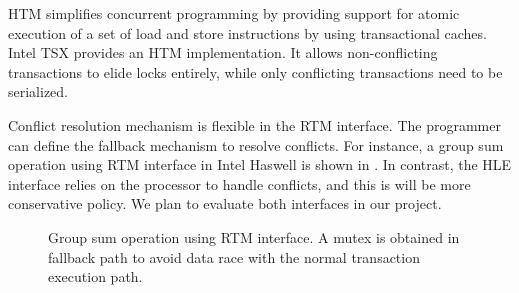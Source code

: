 HTM simplifies concurrent programming by providing support for atomic execution
of a set of load and store instructions by using transactional caches. Intel TSX
provides an HTM implementation. It allows non-conflicting transactions to elide
locks entirely, while only conflicting transactions need to be serialized. 

Conflict resolution mechanism is flexible in the RTM interface. The programmer
can define the fallback mechanism to resolve conflicts. For instance, a group
sum operation using RTM interface in Intel Haswell is shown in .
In contrast, the HLE interface relies on the processor to handle conflicts, and
this is will be more conservative policy. We plan to evaluate both interfaces in
our project.

 \begin{figure}
    \parbox[t]{0.45\textwidth}{} \caption{Group
        sum operation using RTM interface. A mutex is obtained in fallback path
to avoid data race with the normal transaction execution path.} \label{fig:rtm}
\end{figure}


